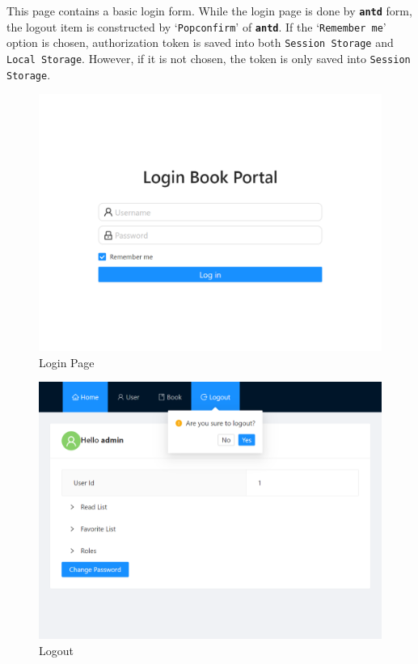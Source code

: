 This page contains a basic login form. While the login page is done by \textbf{\texttt{antd}} form, the logout item is constructed by `\texttt{Popconfirm}' of \textbf{\texttt{antd}}. If the `\texttt{Remember me}' option is chosen, authorization token is saved into both \texttt{Session Storage} and \texttt{Local Storage}. However, if it is not chosen, the token is only saved into \texttt{Session Storage}.

\begin{minipage}{.49\textwidth}
  \begin{figure}[H]
    \centering
  \includegraphics[width=\textwidth]{img/front-end/login-page.png}
  \caption{Login Page}
  \end{figure}
\end{minipage}
\begin{minipage}{.49\textwidth}
  \begin{figure}[H]
    \centering
  \includegraphics[width=\textwidth]{img/front-end/logout.png}
  \caption{Logout}
  \end{figure}
\end{minipage}

